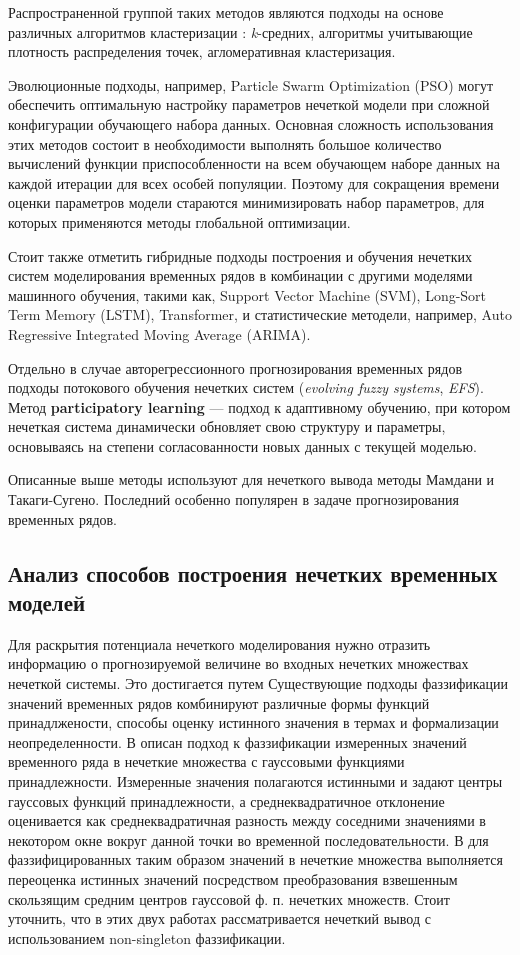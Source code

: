 Распространенной группой таких методов являются подходы на основе различных алгоритмов кластеризации \cite{Lucas2021}:  \textit{k}-средних, алгоритмы учитывающие плотность распределения точек, агломеративная кластеризация.

Эволюционные подходы, например, Particle Swarm Optimization (PSO)\cite{Davari2009} могут обеспечить оптимальную настройку параметров нечеткой модели при сложной конфигурации обучающего набора данных. Основная сложность использования этих методов состоит в необходимости выполнять большое количество вычислений функции приспособленности на всем обучающем наборе данных на каждой итерации для всех особей популяции. Поэтому для сокращения времени оценки параметров модели стараются минимизировать набор параметров, для которых применяются методы глобальной оптимизации.

Стоит также отметить гибридные подходы построения и обучения нечетких систем моделирования временных рядов в комбинации с другими моделями машинного обучения, такими как, Support Vector Machine (SVM), Long-Sort Term Memory (LSTM), Transformer, и статистические методели, например, Auto Regressive Integrated Moving Average (ARIMA).

Отдельно в случае авторегрессионного прогнозирования временных рядов подходы потокового обучения нечетких систем (\textit{evolving fuzzy systems}, \textit{EFS}). Метод \textbf{participatory learning} --- подход к адаптивному обучению, при котором нечеткая система динамически обновляет свою структуру и параметры, основываясь на степени согласованности новых данных с текущей моделью\cite{Lima2010, Alves2021}.

Описанные выше методы используют для нечеткого вывода методы Мамдани и Такаги-Сугено. Последний особенно популярен в задаче прогнозирования временных рядов.

\subsection{Анализ способов построения нечетких временных моделей}

Для раскрытия потенциала нечеткого моделирования нужно отразить информацию о прогнозируемой величине во входных нечетких множествах нечеткой системы. Это достигается путем  Существующие подходы фаззификации значений временных рядов комбинируют различные формы функций принадлжености, способы оценку истинного значения в термах и формализации неопределенности. В \cite{Pekaslan2020} описан подход к фаззификации измеренных значений временного ряда в нечеткие множества с гауссовыми  функциями принадлежности. Измеренные значения полагаются истинными и задают центры гауссовых функций принадлежности, а среднеквадратичное отклонение оценивается как среднеквадратичная разность между соседними значениями в некотором окне вокруг данной точки во временной последовательности.  В \cite{Pourabdollah2017} для фаззифицированных таким образом значений в нечеткие множества выполняется переоценка истинных значений посредством преобразования взвешенным скользящим средним центров гауссовой ф. п. нечетких множеств.  Стоит уточнить, что в этих двух работах рассматривается нечеткий вывод с использованием non-singleton фаззификации.

